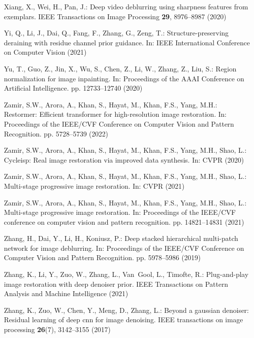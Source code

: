 \documentclass[runningheads]{llncs}
\begin{document}
\begin{thebibliography}{10}
Xiang, X., Wei, H., Pan, J.: Deep video deblurring using sharpness features
  from exemplars. IEEE Transactions on Image Processing  \textbf{29},
  8976--8987 (2020)

Yi, Q., Li, J., Dai, Q., Fang, F., Zhang, G., Zeng, T.: Structure-preserving
  deraining with residue channel prior guidance. In: IEEE International
  Conference on Computer Vision (2021)

Yu, T., Guo, Z., Jin, X., Wu, S., Chen, Z., Li, W., Zhang, Z., Liu, S.: Region
  normalization for image inpainting. In: Proceedings of the AAAI Conference on
  Artificial Intelligence. pp. 12733--12740 (2020)

Zamir, S.W., Arora, A., Khan, S., Hayat, M., Khan, F.S., Yang, M.H.: Restormer:
  Efficient transformer for high-resolution image restoration. In: Proceedings
  of the IEEE/CVF Conference on Computer Vision and Pattern Recognition. pp.
  5728--5739 (2022)

Zamir, S.W., Arora, A., Khan, S., Hayat, M., Khan, F.S., Yang, M.H., Shao, L.:
  Cycleisp: Real image restoration via improved data synthesis. In: CVPR (2020)

Zamir, S.W., Arora, A., Khan, S., Hayat, M., Khan, F.S., Yang, M.H., Shao, L.:
  Multi-stage progressive image restoration. In: CVPR (2021)

Zamir, S.W., Arora, A., Khan, S., Hayat, M., Khan, F.S., Yang, M.H., Shao, L.:
  Multi-stage progressive image restoration. In: Proceedings of the IEEE/CVF
  conference on computer vision and pattern recognition. pp. 14821--14831
  (2021)

Zhang, H., Dai, Y., Li, H., Koniusz, P.: Deep stacked hierarchical multi-patch
  network for image deblurring. In: Proceedings of the IEEE/CVF Conference on
  Computer Vision and Pattern Recognition. pp. 5978--5986 (2019)

Zhang, K., Li, Y., Zuo, W., Zhang, L., Van~Gool, L., Timofte, R.: Plug-and-play
  image restoration with deep denoiser prior. IEEE Transactions on Pattern
  Analysis and Machine Intelligence  (2021)

Zhang, K., Zuo, W., Chen, Y., Meng, D., Zhang, L.: Beyond a gaussian denoiser:
  Residual learning of deep cnn for image denoising. IEEE transactions on image
  processing  \textbf{26}(7),  3142--3155 (2017)


\end{thebibliography}
\end{document}

